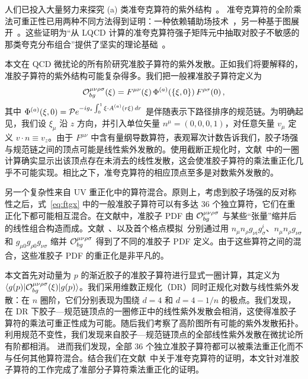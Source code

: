 人们已投入大量努力来探究 (a) 类准夸克算符的紫外结构~\cite{Ishikawa:2016znu,Chen:2016fxx,Monahan:2016bvm,Briceno:2017cpo, Xiong:2017jtn, Constantinou:2017sej, Alexandrou:2017huk, Chen:2017mzz}。
准夸克算符的全阶乘法可重正性已用两种不同方法得到证明：一种依赖辅助场技术~\cite{Ji:2017oey,Green:2017xeu}，另一种基于图展开~\cite{Ishikawa:2017faj}。这些证明为“从 LQCD 计算的准夸克算符强子矩阵元中抽取对胶子不敏感的那类夸克分布组合”提供了坚实的理论基础~\cite{Lin:2014zya,Alexandrou:2015rja,Chen:2016utp,Alexandrou:2016jqi,Zhang:2017bzy,Monahan:2017hpu,Chen:2017lnm,Stewart:2017tvs,Izubuchi:2018srq,Alexandrou:2018pbm,Chen:2018xof,Chen:2018fwa,Liu:2018uuj,Bali:2018spj,Radyushkin:2018nbf,Lin:2018qky,Karpie:2018zaz}。

本文在 QCD 微扰论的所有阶研究准胶子算符的紫外发散。正如我们将要解释的，准胶子算符的紫外结构可能复杂得多。我们把一般裸准胶子算符定义为
\begin{align}\label{eq:ftgx}
\begin{split}
{\cal O}_{bg}^{\mu \nu \rho\sigma}(\xi) = F^{\mu \nu}(\xi)\,\Phi^{(a)}(\{\xi,0\})\, F^{{\rho\sigma}}(0)\,,
\end{split}
\end{align}
其中 $\Phi^{(a)}(\xi,0)={\cal P}e^{-ig_s\int_0^{1} \xi\cdot A^{(a)}(r \xi)\,dr}$ 是伴随表示下路径排序的规范链。为明确起见，我们设 $\xi_\mu$ 沿 $z$ 方向，并引入单位矢量 $n^\mu = (0,0,0, 1)$，对任意矢量 $v_\mu$ 定义 $v\cdot n \equiv v_z$。由于 $F^{\mu\nu}$ 中含有量纲导数算符，表观幂次计数告诉我们，胶子场强与规范链之间的顶点可能是线性紫外发散的。使用截断正规化时，文献~\cite{Wang:2017qyg,Wang:2017eel}中的一圈计算确实显示出该顶点存在未消去的线性发散，这会使准胶子算符的乘法重正化几乎不可能实现。相比之下，准夸克算符的相应顶点至多是对数紫外发散的。

另一个复杂性来自 UV 重正化中的算符混合。原则上，考虑到胶子场强的反对称性之后，式~\eqref{eq:ftgx} 中的一般准胶子算符可以有多达 36 个独立算符，它们在重正化下都可能相互混合。在文献中，准胶子 PDF 由 ${\cal O}_{bg}^{\mu \nu \rho\sigma}$ 与某些“张量”缩并后的线性组合构造而成。文献~\cite{Ji:2013dva}、\cite{Wang:2017eel}以及首个格点模拟~\cite{Fan:2018dxu}分别通过用 $n_\mu n_\rho  g_{\nu i}g_\sigma^{i}$、$n_\mu n_\rho  g_{\nu \sigma}$ 和 $g_{\mu 0}g_{\rho0}  g_{\nu \sigma}$ 缩并 ${\cal O}_{bg}^{\mu \nu \rho\sigma}$ 得到了不同的准胶子 PDF 定义。由于这些算符之间的混合，这些准胶子 PDF 的重正化是非平凡的。

本文首先对动量为 $p$ 的渐近胶子的准胶子算符进行显式一圈计算，其定义为 $\langle g(p)|{\cal O}_{bg}^{\mu \nu \rho\sigma}(\xi) | g(p) \rangle$。我们采用维数正规化（DR）同时正规化对数与线性紫外发散：在 $n$ 圈阶，它们分别表现为围绕 $d=4$ 和 $d=4-1/n$ 的极点。我们发现，在 DR 下胶子—规范链顶点的一圈修正中的线性紫外发散会相消，这使得准胶子算符的乘法可重正性成为可能。随后我们考察了高阶图所有可能的紫外发散拓扑。利用规范不变性，我们发现来自胶子—规范链顶点的全部线性紫外发散在微扰论所有阶都相消。
进而我们发现，全部 36 个独立准胶子算符都可以被乘法重正化而不与任何其他算符混合。结合我们在文献~\cite{Ishikawa:2017faj}中关于准夸克算符的证明，本文针对准胶子算符的工作完成了准部分子算符乘法重正化的证明。

